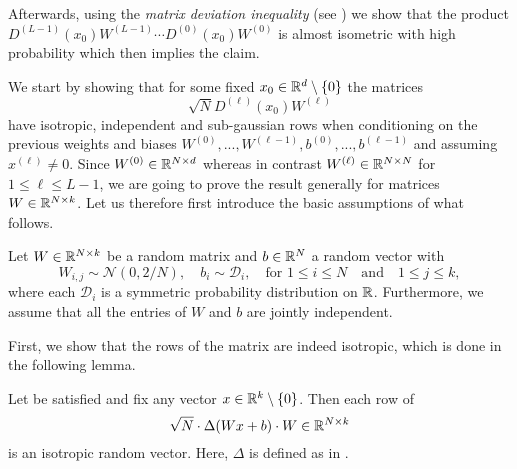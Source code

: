 Afterwards, using the \emph{matrix deviation inequality} (see \cite[Theorem~3]{Liaw2017}) 
we show that the product $D^{(L-1)}(x_0)W^{(L-1)} \cdots D^{(0)}(x_0) W^{(0)}$ is almost isometric 
with high probability which then implies the claim. 

We start by showing that for some fixed $x_0 \in \mathbb{R}^d \setminus \{0\}$ the matrices 
\begin{equation*}
\sqrt{N} D^{(\ell)}(x_0) W^{(\ell)}
\end{equation*}
have isotropic, independent and sub-gaussian rows 
when conditioning on the previous weights and biases $W^{(0)}, ..., W^{(\ell - 1)}, b^{(0)}, ..., b^{(\ell - 1)}$ and assuming $x^{(\ell)} \neq 0$. 
Since $W^{(0)} \in \mathbb{R}^{N \times d}$ whereas in contrast $W^{(\ell)} \in \mathbb{R}^{N \times N}$ for $1 \leq \ell \leq L-1$,
we are going to prove the result generally for matrices $W \in \mathbb{R}^{N \times k}$. 
Let us therefore first introduce the basic assumptions of what follows.
\begin{assumption} \label{assum_1}
Let $W \in \mathbb{R}^{N \times k}$ be a random matrix and $b \in \mathbb{R}^N$ a random vector with 
\begin{equation*}
    W_{i,j} \sim \mathcal{N}\left(0, 2/N\right), \quad b_i \sim \mathcal{D}_i, \quad \text{for } 1 \leq i \leq N \quad \text{and} \quad 1 \leq j \leq k,
\end{equation*}
where each $\mathcal{D}_i$ is a symmetric probability distribution on $\mathbb{R}$. Furthermore, we assume that all the entries of $W$ and $b$ are jointly independent. 
\end{assumption}
First, we show that the rows of the matrix are indeed isotropic, which is done in the following lemma. 
\label{isotropic}
\begin{lemma} \label{thm: isotropic_rows}
Let  be satisfied and fix any vector $x \in \mathbb{R}^k \setminus \{0\}$. Then each row of
\begin{equation*}
    \sqrt{N} \cdot \operatorname{\Delta}(Wx + b) \cdot W \in \mathbb{R}^{N \times k}
\end{equation*}
is an isotropic random vector. Here, $\Delta$ is defined as in .
\end{lemma}
